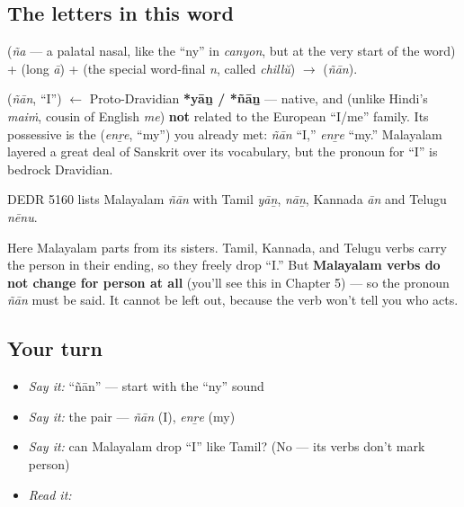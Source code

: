 \subsection*{The letters in this word}
\textbf{} (\emph{ña} — a palatal nasal, like the \textquotedblleft{}ny\textquotedblright{} in \emph{canyon}, but at the very start of the word) + \textbf{} (long \emph{ā}) + \textbf{} (the special word-final \emph{n}, called \emph{chillŭ}) $\to$ \textbf{} (\emph{ñān}).

\begin{cousinweb}
\textbf{} (\emph{ñān}, \textquotedblleft{}I\textquotedblright{}) $\leftarrow$ Proto-Dravidian \textbf{*yāṉ / *ñāṉ} — native, and (unlike Hindi's \emph{maiṁ}, cousin of English \emph{me}) \textbf{not} related to the European \textquotedblleft{}I/me\textquotedblright{} family. Its possessive is the \textbf{} (\emph{enṟe}, \textquotedblleft{}my\textquotedblright{}) you already met: \emph{ñān} \textquotedblleft{}I,\textquotedblright{} \emph{enṟe} \textquotedblleft{}my.\textquotedblright{} Malayalam layered a great deal of Sanskrit over its vocabulary, but the pronoun for \textquotedblleft{}I\textquotedblright{} is bedrock Dravidian.

DEDR 5160 lists Malayalam \emph{ñān} with Tamil \emph{yāṉ}, \emph{nāṉ}, Kannada \emph{ān} and Telugu \emph{nēnu}.
\end{cousinweb}

\begin{grammarlens}[title={Grammar Lens: Malayalam does \emph{not} drop \textquotedblleft{}I\textquotedblright{}}]
Here Malayalam parts from its sisters. Tamil, Kannada, and Telugu verbs carry the person in their ending, so they freely drop \textquotedblleft{}I.\textquotedblright{} But \textbf{Malayalam verbs do not change for person at all} (you'll see this in Chapter 5) — so the pronoun \emph{ñān} must be said. It cannot be left out, because the verb won't tell you who acts.
\end{grammarlens}

\subsection*{Your turn}
\begin{itemize}
\raggedright
  \item \emph{Say it:} \textquotedblleft{}ñān\textquotedblright{} — start with the \textquotedblleft{}ny\textquotedblright{} sound
  \item \emph{Say it:} the pair — \emph{ñān} (I), \emph{enṟe} (my)
  \item \emph{Say it:} can Malayalam drop \textquotedblleft{}I\textquotedblright{} like Tamil? (No — its verbs don't mark person)
  \item \emph{Read it:} \textbf{}
\end{itemize}

